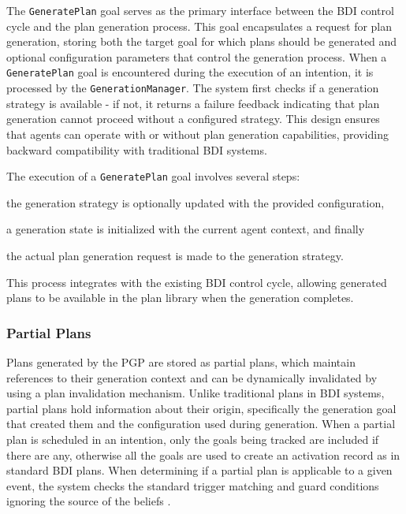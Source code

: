 \documentclass[12pt,a4paper,openright,twoside]{book}
\begin{document}
The \texttt{GeneratePlan} goal serves as the primary interface between the \ac{BDI} control cycle and the plan generation process.
%
This goal encapsulates a request for plan generation, storing both the target goal for which plans should be generated and optional configuration parameters that control the generation process.
%
When a \texttt{GeneratePlan} goal is encountered during the execution of an intention, it is processed by the \texttt{GenerationManager}.
%
The system first checks if a generation strategy is available - if not, it returns a failure feedback indicating that plan generation cannot proceed without a configured strategy.
%
This design ensures that agents can operate with or without plan generation capabilities, providing backward compatibility with traditional BDI systems.

The execution of a \texttt{GeneratePlan} goal involves several steps:
%
\begin{inlinelist}
    \item the generation strategy is optionally updated with the provided configuration,
    \item a generation state is initialized with the current agent context, and finally
    \item the actual plan generation request is made to the generation strategy.
\end{inlinelist} 
%
This process integrates with the existing \ac{BDI} control cycle, allowing generated plans to be available in the plan library when the generation completes.

\subsubsection{Partial Plans}

Plans generated by the \ac{PGP} are stored as partial plans, which maintain references to their generation context and can be dynamically invalidated by using a plan invalidation mechanism.
%
Unlike traditional plans in \ac{BDI} systems, partial plans hold information about their origin, specifically the generation goal that created them and the configuration used during generation.
%
When a partial plan is scheduled in an intention, only the goals being tracked are included if there are any, otherwise all the goals are used to create an activation record as in standard \ac{BDI} plans.
%
When determining if a partial plan is applicable to a given event, the system checks the standard trigger matching and guard conditions ignoring the source of the beliefs \footnotemark{}.
%
\end{document}
